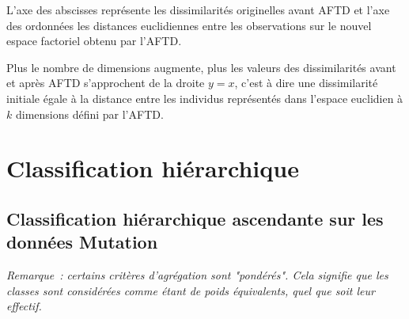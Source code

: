 \documentclass[a4paper,10pt]{report}
\begin{document}
L'axe des abscisses représente les dissimilarités originelles avant AFTD et l'axe des ordonnées les distances euclidiennes entre les observations sur le nouvel espace factoriel obtenu par l'AFTD.

Plus le nombre de dimensions augmente, plus les valeurs des dissimilarités avant et après AFTD s'approchent de la droite $y = x$, c'est à dire une dissimilarité initiale égale à la distance entre les individus représentés dans l'espace euclidien à $k$ dimensions défini par l'AFTD.







\chapter{Classification hiérarchique}

\section{Classification hiérarchique ascendante sur les données Mutation}
\label{section:mut-class-hierarchique}

\textit{Remarque~: certains critères d'agrégation sont "pondérés". Cela signifie que les classes sont considérées comme étant de poids équivalents, quel que soit leur effectif.}
\end{document}
